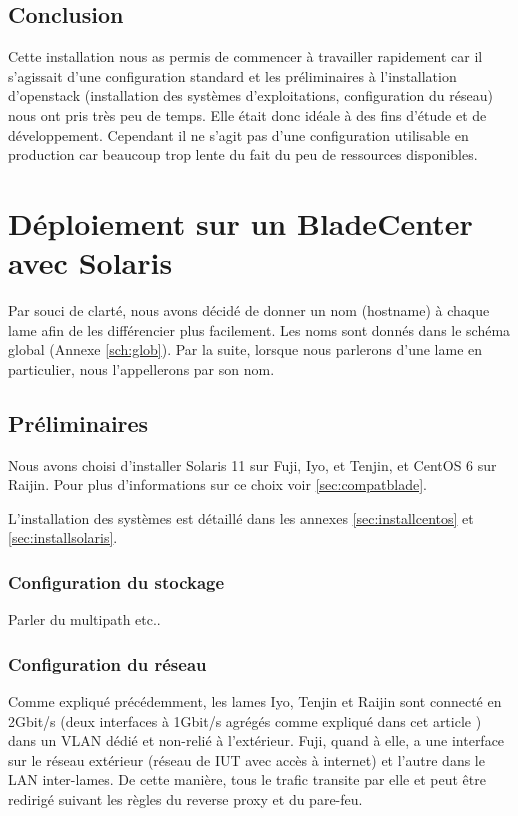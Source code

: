 \documentclass[a4paper,oneside]{report}
\begin{document}
\subsection{Conclusion}
Cette installation nous as permis de commencer à travailler rapidement car il s'agissait d'une configuration standard et les préliminaires à l'installation d'\gls{openstack} (installation des systèmes d'exploitations, configuration du réseau) nous ont pris très peu de temps.
Elle était donc idéale à des fins d'étude et de développement.\newline
Cependant il ne s'agit pas d'une configuration utilisable en production car beaucoup trop lente du fait du peu de ressources disponibles.

\section{Déploiement sur un BladeCenter avec Solaris} \label{sec:depsolaris}

Par souci de clarté, nous avons décidé de donner un nom (hostname) à chaque lame afin de les différencier plus facilement.
Les noms sont donnés dans le schéma global (Annexe \ref{sch:glob}).
Par la suite, lorsque nous parlerons d'une lame en particulier, nous l'appellerons par son nom.

\subsection{Préliminaires}
Nous avons choisi d'installer Solaris 11 sur Fuji, Iyo, et Tenjin, et CentOS 6 sur Raijin.
Pour plus d'informations sur ce choix voir \ref{sec:compatblade}.

L'installation des systèmes est détaillé dans les annexes \ref{sec:installcentos} et \ref{sec:installsolaris}.

\subsubsection{Configuration du stockage}
Parler du multipath etc..

\subsubsection{Configuration du réseau}
Comme expliqué précédemment, les lames Iyo, Tenjin et Raijin sont connecté en 2Gbit/s (deux interfaces à 1Gbit/s agrégés comme expliqué dans cet article \cite{SolarisLA}) dans un VLAN dédié et non-relié à l'extérieur.
Fuji, quand à elle, a une interface sur le réseau extérieur (réseau de IUT avec accès à internet) et l'autre dans le LAN inter-lames.
De cette manière, tous le trafic transite par elle et peut être redirigé suivant les règles du reverse proxy et du pare-feu. 
\end{document}
